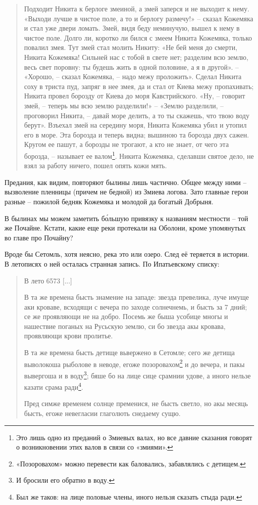 \begin{quotation}
Подходит Никита к берлоге змеиной, а змей заперся и не выходит к нему. «Выходи лучше в чистое поле, а то и берлогу размечу!» – сказал Кожемяка и стал уже двери ломать. Змей, видя беду неминучую, вышел к нему в чистое поле. Долго ли, коротко ли бился с змеем Никита Кожемяка, только повалил змея. Тут змей стал молить Никиту: «Не бей меня до смерти, Никита Кожемяка! Сильней нас с тобой в свете нет; разделим всю землю, весь свет поровну: ты будешь жить в одной половине, а я в другой». – «Хорошо, – сказал Кожемяка, – надо межу проложить». Сделал Никита соху в триста пуд, запряг в нее змея, да и стал от Киева межу пропахивать; Никита провел борозду от Киева до моря Кавстрийского. «Ну, – говорит змей, – теперь мы всю землю разделили!» – «Землю разделили, – проговорил Никита, – давай море делить, а то ты скажешь, что твою воду берут». Взъехал змей на середину моря, Никита Кожемяка убил и утопил его в море. Эта борозда и теперь видна; вышиною та борозда двух сажен. Кругом ее пашут, а борозды не трогают, а кто не знает, от чего эта борозда, – называет ее валом\footnote{Это лишь одно из преданий о Змиевых валах, но все давние сказания говорят о возникновении этих валов в связи со «змиями».}. Никита Кожемяка, сделавши святое дело, не взял за работу ничего, пошел опять кожи мять. 
\end{quotation}

Предания, как видим, повторяют былины лишь частично. Общее между ними – вызволение пленницы (причем не бедной) из Змиева логова. Зато главные герои разные – пожилой бедняк Кожемяка и молодой да богатый Добрыня.

В былинах мы можем заметить б\'ольшую привязку к названиям местности – той же Почайне. Кстати, какие еще реки протекали на Оболони, кроме упомянутых во главе про Почайну?

Вроде бы Сетомль, хотя неясно, река это или озеро. След её теряется в истории. В летописях о ней осталась странная запись. По Ипатьевскому списку:

\begin{quotation}
В лето 6573 [...]

В та же времена бысть знамение на западе: звезда превелика, луче имуще аки кроваве, всходящи с вечера по заходе солнечнемь, и бысть за 7 дний; се же проявляющи не на добро. Посемь же быша усобице многы и нашествие поганых на Русьскую землю, си бо звезда акы кровава, проявляющи крови пролитье.

В та же времена бысть детище вьвержено в Сетомле; сего же детища выволокоша рыболове в неводе, егоже позоровахом\footnote{«Позоровахом» можно перевести как баловались, забавлялись с детищем.} и до вечера, и пакы вывергоша и в воду\footnote{И бросили его обратно в воду.}; бяше бо на лице сице срамнии удове, а иного нельзе казати срама ради\footnote{Был же таков: на лице половые члены, иного нельзя сказать стыда ради.}.

Пред симже временем солнце пременися, не бысть светло, но акы месяць бысть, егоже невегласии глаголють снедаему сущю.
\end{quotation}

